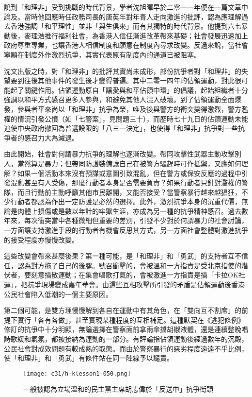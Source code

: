 說到「和理非」受到挑戰的時代背景，學者沈旭暉早於二零一一年便在一篇文章中論及。當時他回應時任政務司長的唐英年對年青人走向激進的批評，認為應理解過去香港強調「和平理性」並非「與生俱來」而有其獨特的時代背景。他提到六七暴動後，麥理浩推行福利社會，為香港人信任漸進改革帶來基礎；社會發展迅速加上政府尊重專業，也讓香港人相信制度和願意在制度內尋求改變。反過來說，當社會寧願在制度外作激烈抗爭，其實代表原有制度內的通道已被阻塞。

沈文出版之時，對「和理非」的批評其實尚未成形，部份抗爭者對「和理非」的失望要到往後其他事件的發生後才變得普遍。其中二零一四年的佔領運動，對此很可能起了關鍵作用。佔領運動原自「讓愛與和平佔領中環」的倡議，起始組織者十分強調以和平方式感召更多人參與，和避免其他人混入破壞。到了佔領運動全面爆發，參與者平來尚以「和理非」抗爭為榮，唯及後與警方的衝突變得激烈，警方濫權的情況引發公憤（如「七警案」，見問題三十），而歷時七十九日的佔領運動未能迫使中央政府撤回為普選設限的「八三一決定」，也使得「和理非」抗爭對一些抗爭者的感召力大為減退。

由此開始，社會對何謂暴力抗爭的理解也逐漸改變。帶同攻擊性武器主動攻擊別人，當然算是暴力；但帶同防護裝備讓自己在被警方驅趕時可作抵禦，又應如何理解？如果一個活動本來沒有預謀或意圖引致混亂，但在警方或保安反應的過程中引發混亂甚至有人受傷，那麼行動者本身是否需要負責？如果行動者只針對濫權的警隊，而且行動前主動呼籲其他市民離開，又能否接受？當警察暴行越來越猖狂，不少行動者都認為作出一定防護是必然的選擇。此外，激烈抗爭本身的沉重代價，無論是肉體上損傷或是數以年計的牢獄生涯，亦成為另一種的抗爭精神感召。過去數年來，每次衝突當中各種微細但重要的差別，引發不少對於何謂暴力的社會討論，一方面讓支持激進手段的行動者有機會反思其方式，另一方面社會整體對激進抗爭的接受程度亦慢慢改變。

這些改變會帶來甚麼後果？第一種可能，是「和理非」和「勇武」的支持者互不信任，認為對方拖了自己的後腿。號召衝擊的，會被溫和一方指責是受北京指使的潛伏者，要刻意搞散運動；在集會唱歌打氣的，會被激進一方指責是搞「卡拉OK社運」，把抗爭現場變成嘉年華會。由這些互相攻擊所引發的矛盾是佔領運動後香港公民社會陷入低潮的一個主要原因。

第二個可能，是雙方理慢慢解到各自在運動中有其角色，在「雙向互不割席」的前提下實行「各有各做」，甚至實現某種程度的互相補足。這種默契在《逃犯條例》修訂的抗爭中十分明顯，無論選擇在警察面前拿雨傘擋胡椒液體，還是連續整晚唱詩歌緩和氣氛，都被接納為運動的一部分。有評論指佔領運動後經過數年的沉殿，公民社會對成效問題有較成熟的取態。而由於警察暴行的惡劣程度遠遠不乎比例，使「和理非」和「勇武」有條件站在同一陣線予以譴責。

\begin{figure}[htbp]
    \centering
    \texttt{[image: c31/h-klesson1-050.png]}
    \caption{一般被認為立場溫和的民主黨主席胡志偉於「反送中」抗爭街頭} 
\end{figure}

